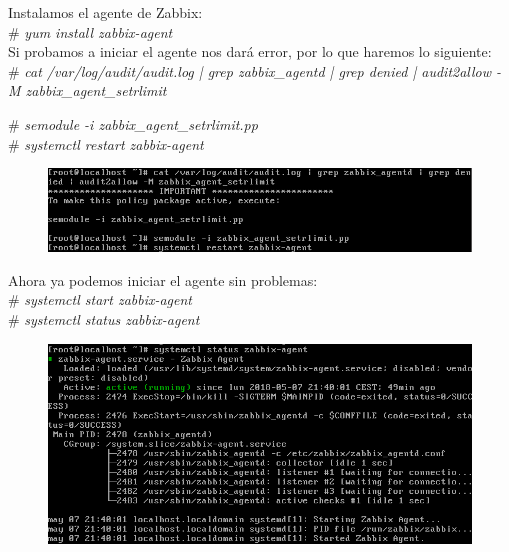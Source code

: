 Instalamos el agente de Zabbix: \\
\# \textit{yum install zabbix-agent} \\



Si probamos a iniciar el agente nos dará error, por lo que haremos lo siguiente: \\
\# \textit{cat /var/log/audit/audit.log | grep zabbix\_agentd | grep denied |
	audit2allow -M zabbix\_agent\_setrlimit} 

\# \textit{semodule -i zabbix\_agent\_setrlimit.pp} \\

\# \textit{systemctl restart zabbix-agent} \\


\begin{figure}[h]
	\centering
	\includegraphics[scale=0.5]{images/next.png}
\end{figure}


Ahora ya podemos iniciar el agente sin problemas: \\
\# \textit{systemctl start zabbix-agent} \\
\# \textit{systemctl status zabbix-agent} \\

\begin{figure}[h]
	\centering
	\includegraphics[scale=0.5]{images/next2.png}
\end{figure}






